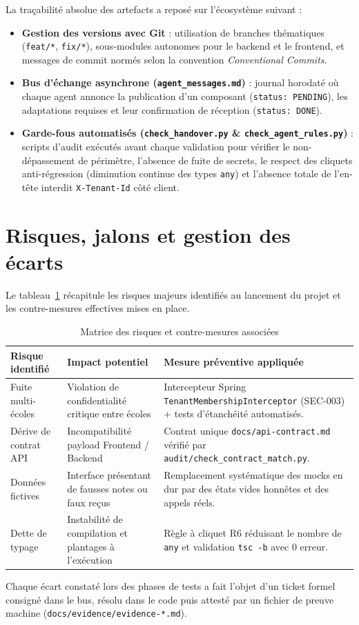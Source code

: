 La traçabilité absolue des artefacts a reposé sur l'écosystème suivant :
\begin{itemize}
    \item \textbf{Gestion des versions avec Git} : utilisation de branches thématiques (\texttt{feat/*}, \texttt{fix/*}), sous-modules autonomes pour le backend et le frontend, et messages de commit normés selon la convention \emph{Conventional Commits}.
    \item \textbf{Bus d'échange asynchrone (\texttt{agent\_messages.md})} : journal horodaté où chaque agent annonce la publication d'un composant (\texttt{status: PENDING}), les adaptations requises et leur confirmation de réception (\texttt{status: DONE}).
    \item \textbf{Garde-fous automatisés (\texttt{check\_handover.py} \& \texttt{check\_agent\_rules.py})} : scripts d'audit exécutés avant chaque validation pour vérifier le non-dépassement de périmètre, l'absence de fuite de secrets, le respect des cliquets anti-régression (diminution continue des types \texttt{any}) et l'absence totale de l'en-tête interdit \texttt{X-Tenant-Id} côté client.
\end{itemize}

\section{Risques, jalons et gestion des écarts}

Le tableau~\ref{tab:risques-projet} récapitule les risques majeurs identifiés au lancement du projet et les contre-mesures effectives mises en place.

\begin{table}[h]
\centering
\small
\begin{tabular}{lp{4.5cm}p{5.5cm}}
\toprule
\textbf{Risque identifié} & \textbf{Impact potentiel} & \textbf{Mesure préventive appliquée} \\
\midrule
Fuite multi-écoles & Violation de confidentialité critique entre écoles & Intercepteur Spring \texttt{TenantMembershipInterceptor} (SEC-003) + tests d'étanchéité automatisés. \\
Dérive de contrat API & Incompatibilité payload Frontend / Backend & Contrat unique \nolinkurl{docs/api-contract.md} vérifié par \nolinkurl{audit/check_contract_match.py}. \\
Données fictives & Interface présentant de fausses notes ou faux reçus & Remplacement systématique des mocks en dur par des états vides honnêtes et des appels réels. \\
Dette de typage & Instabilité de compilation et plantages à l'exécution & Règle à cliquet R6 réduisant le nombre de \texttt{any} et validation \texttt{tsc -b} avec 0 erreur. \\
\bottomrule
\end{tabular}
\caption{Matrice des risques et contre-mesures associées}
\label{tab:risques-projet}
\end{table}

Chaque écart constaté lors des phases de tests a fait l'objet d'un ticket formel consigné dans le bus, résolu dans le code puis attesté par un fichier de preuve machine (\nolinkurl{docs/evidence/evidence-*.md}).
